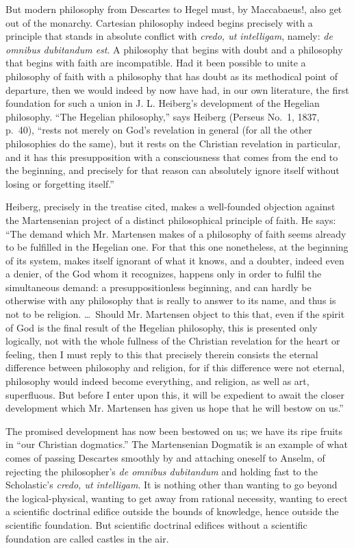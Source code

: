\documentclass[12pt]{book}
\newcommand{\opage}[1]{\marginnote{\footnotesize\textit{[#1]}}}
\begin{document}
But modern philosophy from Descartes to Hegel must, by Maccabaeus!, also get out of the monarchy. Cartesian philosophy indeed begins precisely with a principle that stands in absolute conflict with \textit{credo, ut intelligam}, namely: \textit{de omnibus dubitandum est}. A philosophy that begins with doubt and a philosophy that begins with faith are incompatible. Had it been possible to unite a philosophy of faith with a philosophy that has doubt as its methodical point of departure, then we would indeed by now have had, in our own literature, the first foundation for such a union in J. L. Heiberg's development of the Hegelian philosophy. ``The Hegelian philosophy,'' says Heiberg (Perseus No.~1, 1837,
\opage{106}\setcounter{footnote}{0}%
p.~40), ``rests not merely on God's revelation in general (for all the other philosophies do the same), but it rests on the Christian revelation in particular, and it has this presupposition with a consciousness that comes from the end to the beginning, and precisely for that reason can absolutely ignore itself without losing or forgetting itself.''

Heiberg, precisely in the treatise cited, makes a well-founded objection against the Martensenian project of a distinct philosophical principle of faith. He says: ``The demand which Mr. Martensen makes of a philosophy of faith seems already to be fulfilled in the Hegelian one. For that this one nonetheless, at the beginning of its system, makes itself ignorant of what it knows, and a doubter, indeed even a denier, of the God whom it recognizes, happens only in order to fulfil the simultaneous demand: a presuppositionless beginning, and can hardly be otherwise with any philosophy that is really to answer to its name, and thus is not to be religion. \dots\ Should Mr. Martensen object to this that, even if the spirit of God is the final result of the Hegelian philosophy, this is presented only logically, not with the whole fullness of the Christian revelation for the heart or feeling, then I must reply to this that precisely therein consists the eternal difference between philosophy and religion, for if this difference were not eternal, philosophy would indeed become everything, and religion, as well as art, superfluous. But before I enter upon this, it will be expedient to await the closer development which Mr. Martensen has given us hope that he will bestow on us.''

The promised development has now been bestowed on us; we have its ripe fruits in ``our Christian dogmatics.'' The Martensenian Dogmatik is an example of what comes of passing Descartes smoothly by and attaching oneself to Anselm, of rejecting the philosopher's \textit{de omnibus dubitandum} and holding fast to the Scholastic's \textit{credo, ut intelligam}. It is nothing other than wanting to go beyond the logical-physical,
\opage{107}\setcounter{footnote}{0}%
wanting to get away from rational necessity, wanting to erect a scientific doctrinal edifice outside the bounds of knowledge, hence outside the scientific foundation. But scientific doctrinal edifices without a scientific foundation are called castles in the air.
\end{document}
